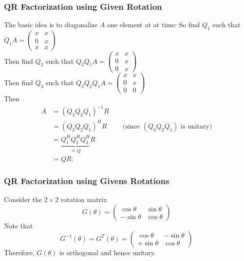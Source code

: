 \documentclass{beamer}
\begin{document}
\begin{frame}\frametitle{QR Factorization using Given Rotation}
	The basic idea is to diagonalize $A$ one element at at time:
	So find $Q_1$ such that 
		$Q_1A = \begin{pmatrix}x&x\\0&x\\x&x\end{pmatrix}$
		\\
	Then find $Q_2$ such that 
		$Q_2Q_1A = \begin{pmatrix}x&x\\0&x\\0&x\end{pmatrix}$
		\\
	Then find $Q_3$ such that 
		$Q_3Q_2Q_1A = \begin{pmatrix}x&x\\0&x\\0&0\end{pmatrix}$
		\\
	Then 
	\begin{align*}
	A &= (Q_3Q_2Q_1)^{-1}R\\
	&= (Q_3Q_2Q_1)^HR \qquad \text{ (since $(Q_3Q_2Q_1)$ is unitary)}\\
	&= \underbrace{Q_1^HQ_2^HQ_3^H}_{\hat{=}Q}R\\
	&= QR.
	\end{align*}
\end{frame}

\begin{frame}\frametitle{QR Factorization using Givens Rotations}
	Consider the $2\times 2$ rotation matrix
	\[ 
		G(\theta) 
			= \begin{pmatrix} 
	    		\cos\theta & \sin\theta \\
	  			-\sin\theta & \cos\theta
	  		  \end{pmatrix}
	\]
	Note that 
	\[
		G^{-1}(\theta) 
			= G^T(\theta) 
			= \begin{pmatrix}
	    		\cos\theta & -\sin\theta\\
	  			+\sin\theta & \cos\theta
	  		  \end{pmatrix}
	\]
	Therefore, $G(\theta)$ is orthogonal and hence unitary.	
\end{frame}
\end{document}
